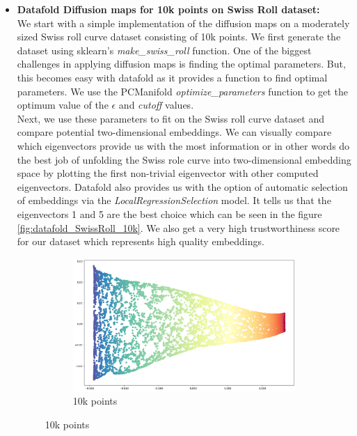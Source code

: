 \begin{itemize}
	      \begin{itemize}
	      	\item \textbf{Datafold Diffusion maps for 10k points on Swiss Roll dataset:}\\
	      	      We start with a simple implementation of the diffusion maps on a moderately sized Swiss roll curve dataset consisting of 10k points. We first generate the dataset using sklearn's \textit{make\_swiss\_roll} function. One of the biggest challenges in applying diffusion maps is finding the optimal parameters. But, this becomes easy with datafold as it provides a function to find optimal parameters. We use the PCManifold \textit{optimize\_parameters} function to get the optimum value of the $\epsilon$ and \textit{cutoff} values.\\
	      	      Next, we use these parameters to fit on the Swiss roll curve dataset and compare potential two-dimensional embeddings. We can visually compare which eigenvectors provide us with the most information or in other words do the best job of unfolding the Swiss role curve into two-dimensional embedding space by plotting the first non-trivial eigenvector with other computed eigenvectors. Datafold also provides us with the option of automatic selection of embeddings via the \textit{LocalRegressionSelection} model. It tells us that the eigenvectors 1 and 5 are the best choice which can be seen in the figure \ref{fig:datafold_SwissRoll_10k}. We also get a very high trustworthiness score for our dataset which represents high quality embeddings.
	      	      \begin{figure}[H]
	      	      	\centering
	      	      	\begin{subfigure}{0.5\textwidth}
	      	      		\includegraphics[width=\linewidth]{images/swiss_roll10k.png}
	      	      		\caption{10k points}

\end{subfigure}
\end{figure}
\end{itemize}
\end{itemize}
